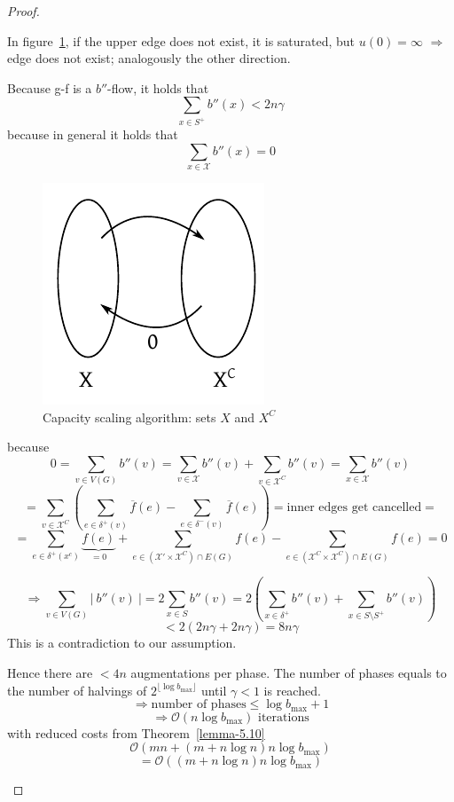 \documentclass{article}
\newcommand{\card}[1]{\left|\:\!#1\:\!\right|}
\begin{document}
\begin{proof}
\begin{itemize}
      In figure~\ref{fig:csa-xc}, if the upper edge does not exist, it is saturated,
      but $u(0) = \infty$ $\Rightarrow$ edge does not exist; analogously the other direction.

      Because g-f is a $b''$-flow, it holds that
      \[ \sum_{x \in S^+} b''(x) < 2n\gamma \]
      because in general it holds that
      \[ \sum_{x \in \mathcal{X}} b''(x) = 0 \]

      \begin{figure}[!ht]
        \begin{center}
          \includegraphics{img/capacity_scaling_algo_proof_edge.pdf}
          \caption{Capacity scaling algorithm: sets $X$ and $X^C$}
          \label{fig:csa-xc}
        \end{center}
      \end{figure}

      because
      \[
        0 = \sum_{v \in V(G)} b''(v)
          = \sum_{v \in \mathcal{X}} b''(v) + \sum_{v \in \mathcal{X}^C} b''(v)
          = \sum_{x \in \mathcal{X}} b''(v)
      \] \[
        = \sum_{v \in \mathcal{X}^C} \left(
          \sum_{e \in \delta^+(v)} \overline{f}(e) - \sum_{e \in \delta^-(v)} \overline{f}(e)
        \right)
        = \text{inner edges get cancelled} =
      \] \[
        = \sum_{e \in \delta^+(x^c)} \underbrace{f(e)}_{=0} + \sum_{e \in (\mathcal{X}' \times \mathcal{X}^C) \cap E(G)} f(e) - \sum_{e \in (\mathcal{X}^C \times \mathcal{X}^C) \cap E(G)} f(e) = 0
      \]

      \[
        \Rightarrow \sum_{v \in V(G)} \card{b''(v)}
          = 2\sum_{x \in S} b''(v)
          = 2\left(\sum_{x \in \delta^+} b''(v) + \sum_{x \in S \setminus S^+} b''(v)\right)
      \] \[
          < 2 (2n\gamma + 2n\gamma) = 8n\gamma
      \]
      This is a contradiction to our assumption.

      Hence there are $<4n$ augmentations per phase. The number of phases equals to the number of halvings of $2^{\lfloor \log{b_{\text{max}}}\rfloor}$ until $\gamma < 1$ is reached.
      \[ \Rightarrow \text{number of phases} \leq \log{b_{\text{max}}} + 1 \]
      \[ \Rightarrow \mathcal{O}(n \log{b_{\text{max}}}) \text{ iterations} \]
      with reduced costs from Theorem~\ref{lemma-5.10}
      \[ \mathcal{O}(mn + (m + n \log{n}) n \log{b_{\text{max}}}) \]
      \[ = \mathcal{O}((m + n \log{n}) n \log{b_{\text{max}}}) \]
  \end{itemize}

\end{proof}
\end{document}
